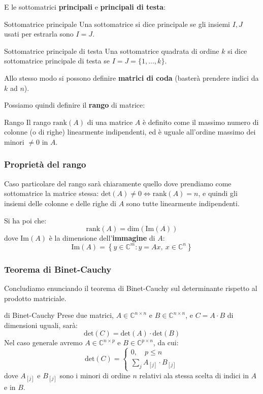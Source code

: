 \documentclass[a4paper,11pt]{article}
\begin{document}
E le sottomatrici \textbf{principali} e \textbf{principali di testa}:
\begin{definition}{Sottomatrice principale}
	Una sottomatrice si dice principale se gli insiemi $I, J$ usati per estrarla sono $I = J$.
\end{definition}
\begin{definition}{Sottomatrice principale di testa}
	Una sottomatrice quadrata di ordine $k$ si dice sottomatrice principale di testa se $I = J = \{ 1, ..., k \}$.
\end{definition}
Allo stesso modo si possono definire \textbf{matrici di coda} (basterà prendere indici da $k$ ad $n$).

Possiamo quindi definire il \textbf{rango} di matrice:
\begin{definition}{Rango}
	Il rango $\mathrm{rank}(A)$ di una matrice $A$ è definito come il massimo numero di colonne (o di righe) linearmente indipendenti, ed è uguale all'ordine massimo dei minori $\neq 0$ in $A$.
\end{definition}

\subsubsection{Proprietà del rango}
Caso particolare del rango sarà chiaramente quello dove prendiamo come sottomatrice la matrice stessa: $\mathrm{det}(A) \neq 0 \Leftrightarrow \mathrm{rank}(A) = n$, e quindi gli insiemi delle colonne e delle righe di $A$ sono tutte linearmente indipendenti.

Si ha poi che:
$$
\mathrm{rank}(A) = \mathrm{dim}(\mathrm{Im}(A))
$$
dove $\mathrm{Im}(A)$ è la dimensione dell'\textbf{immagine} di $A$:
$$
\mathrm{Im}(A) = \left\{ y \in \mathbb{C}^m : y = Ax, \ x \in \mathbb{C}^n \right\}
$$

\subsubsection{Teorema di Binet-Cauchy}
Concludiamo enunciando il teorema di Binet-Cauchy sul determinante rispetto al prodotto matriciale.
\begin{theorem}{di Binet-Cauchy}
	Prese due matrici, $A \in \mathbb{C}^{n \times n}$ e $B \in \mathbb{C}^{n \times n}$, e $C = A \cdot B$ di dimensioni uguali, sarà:
	$$
	\mathrm{det}(C) = \mathrm{det}(A) \cdot \mathrm{det}(B)
	$$
Nel caso generale avremo $A \in \mathbb{C}^{n \times p}$ e $B \in \mathbb{C}^{p \times n}$, da cui:
$$
\mathrm{det}(C) =
	\begin{cases}
		0, \quad p \leq n \\
		\sum_j A_{[j]} \cdot B_{[j]}
	\end{cases}
$$
dove $A_{[j]}$ e $B_{[j]}$ sono i minori di ordine $n$ relativi ala stessa scelta di indici in $A$ e in $B$.
\end{theorem}
\end{document}

